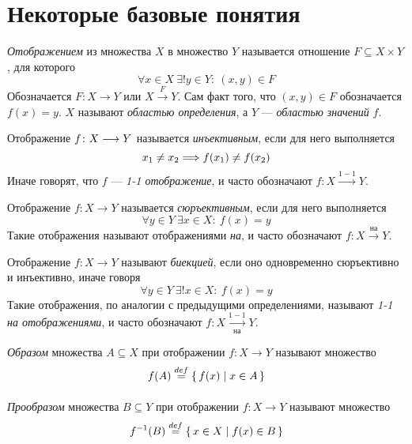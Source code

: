 \section{Некоторые базовые понятия}

\begin{definition}
    \textit{Отображением} из множества $X$ в множество $Y$ называется
    отношение $F \subseteq X \times Y$, для которого
\[
    \forall x \in X~\exists! y \in Y \colon ~(x, y) \in F
\]
Обозначается $F \colon X \to Y$ или $X \xrightarrow{F} Y$. Сам факт того, что $(x, y) \in F$ обозначается $f(x) = y$. $X$ называют \textit{областью определения}, а $Y$ --- \textit{областью значений} $f$.
\end{definition}

\begin{definition}
    Отображение $f \colon X \longrightarrow Y$ называется \textit{инъективным}, если для него выполняется
\[
    x_1 \neq x_2 \Longrightarrow f(x_1) \neq f(x_2)
\]
Иначе говорят, что $f$ --- \textit{1-1 отображение}, и часто обозначают
$f \colon X \xrightarrow{1-1} Y$.
\end{definition}

\begin{definition}
    Отображение $f \colon X \to Y$ называется \textit{сюръективным}, если для него выполняется
\[
    \forall y \in Y~ \exists x \in X \colon~ f(x) = y
\]
Такие отображения называют отображениями \textit{на}, и часто обозначают
$f \colon X \xrightarrow{\text{на}} Y$.

\end{definition}

\begin{definition}
    Отображение $f \colon X \to Y$ называют \textit{биекцией}, если оно одновременно сюръективно и инъективно, иначе говоря
\[
    \forall y \in Y~ \exists! x \in X \colon~ f(x) = y
\]
Такие отображения, по аналогии с предыдущими определениями,
называют \textit{1-1 на отображениями}, и часто обозначают
$f \colon X \xrightarrow[\text{на}]{1-1} Y$.
\end{definition}

\begin{definition}
    \textit{Образом} множества $A \subseteq X$ при отображении $f \colon X \to Y$
    называют множество
\[
    f(A) \overset{def}{\underset{}{=}} \{\, f(x) \mid x \in A \,\}
\]
\end{definition}

\begin{definition}
    \textit{Прообразом} множества $B \subseteq Y$ при отображении
    $f \colon X \to Y$ называют множество
\[
    f^{-1}(B) \overset{def}{\underset{}{=}} \{\, x \in X \mid f(x) \in B \,\}
\]
\end{definition}

